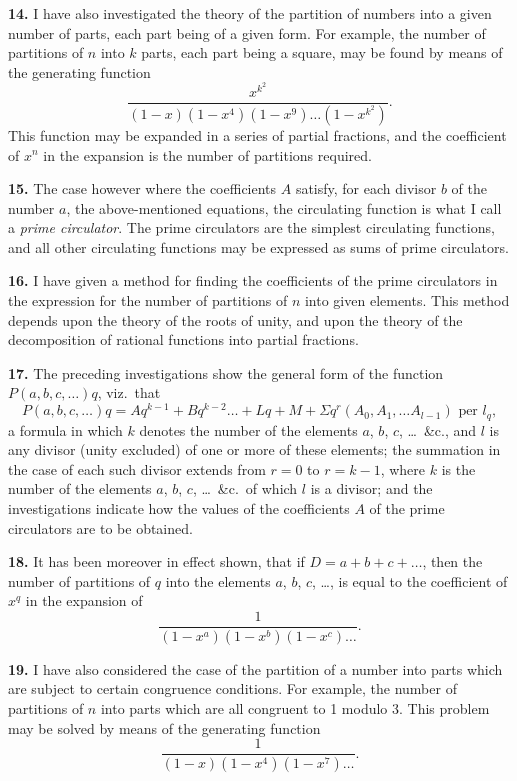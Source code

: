 \documentclass[12pt,a4paper]{article}
\begin{document}
\textbf{14.} I have also investigated the theory of the partition of numbers into a given number of parts, each part being of a given form. For example, the number of partitions of $n$ into $k$ parts, each part being a square, may be found by means of the generating function
\[
\frac{x^{k^2}}{(1-x)(1-x^4)(1-x^9)\ldots(1-x^{k^2})}.
\]
This function may be expanded in a series of partial fractions, and the coefficient of $x^n$ in the expansion is the number of partitions required.

\newpage
\setcounter{page}{240}

\textbf{15.} The case however where the coefficients $A$ satisfy, for each divisor $b$ of the number $a$, the above-mentioned equations, the circulating function is what I call a \textit{prime circulator}. The prime circulators are the simplest circulating functions, and all other circulating functions may be expressed as sums of prime circulators.

\textbf{16.} I have given a method for finding the coefficients of the prime circulators in the expression for the number of partitions of $n$ into given elements. This method depends upon the theory of the roots of unity, and upon the theory of the decomposition of rational functions into partial fractions.

\textbf{17.} The preceding investigations show the general form of the function $P(a, b, c, \ldots)q$, viz.\ that
\[
P(a, b, c, \ldots)q = Aq^{k-1} + Bq^{k-2} \ldots + Lq + M + \Sigma q^r (A_0, A_1, \ldots A_{l-1}) \text{ per } l_q,
\]
a formula in which $k$ denotes the number of the elements $a$, $b$, $c$, \ldots\ \&c., and $l$ is any divisor (unity excluded) of one or more of these elements; the summation in the case of each such divisor extends from $r = 0$ to $r = k-1$, where $k$ is the number of the elements $a$, $b$, $c$, \ldots\ \&c.\ of which $l$ is a divisor; and the investigations indicate how the values of the coefficients $A$ of the prime circulators are to be obtained.

\newpage
\setcounter{page}{241}

\textbf{18.} It has been moreover in effect shown, that if $D = a + b + c + \ldots$, then the number of partitions of $q$ into the elements $a$, $b$, $c$, \ldots, is equal to the coefficient of $x^q$ in the expansion of
\[
\frac{1}{(1-x^a)(1-x^b)(1-x^c)\ldots}.
\]

\textbf{19.} I have also considered the case of the partition of a number into parts which are subject to certain congruence conditions. For example, the number of partitions of $n$ into parts which are all congruent to 1 modulo 3. This problem may be solved by means of the generating function
\[
\frac{1}{(1-x)(1-x^4)(1-x^7)\ldots}.
\]
\end{document}
